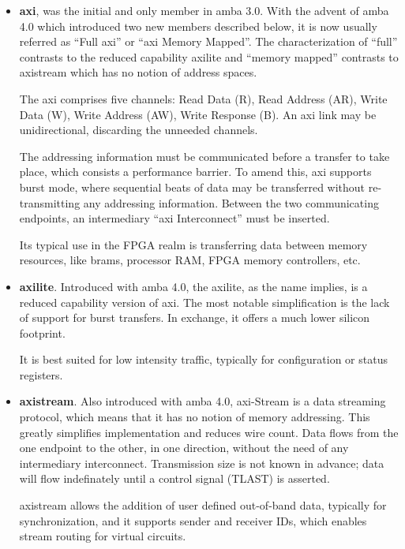 \begin{itemize}
\item	\textbf{\gls{axi}}, was the initial and only member in \gls{amba} 3.0. 
	With the advent of \gls{amba} 4.0 which introduced
	two new members described below, it is now usually 
	referred as ``Full \gls{axi}'' or ``\gls{axi} Memory Mapped''.
	The characterization of ``full'' contrasts to 
	the reduced capability \gls{axilite} and ``memory mapped''
	contrasts to \gls{axistream} which has no notion of address spaces.

	The \gls{axi} comprises five channels: Read Data (R), Read Address (AR),
	Write Data (W), Write Address (AW), Write Response (B). An \gls{axi} link
	may be unidirectional, discarding the unneeded channels.

	The addressing information must be communicated before a transfer to take place, 
	which consists a performance barrier. 
	To amend this, \gls{axi} supports \gls{burst} mode, 
	where sequential \glspl{beat} of data may be transferred without 
	re-transmitting any addressing information.
	Between the two communicating endpoints, 
	an intermediary ``\gls{axi} Interconnect'' must be inserted.

	Its typical use in the FPGA realm is transferring data between memory resources,
 	like \glspl{bram}, processor RAM, FPGA memory controllers, etc.

\item	\textbf{\gls{axilite}}. Introduced with \gls{amba} 4.0, 
	the \gls{axilite}, as the  name implies,
	is a reduced capability version of \gls{axi}. 
	The most notable simplification is the 
	lack of support for \gls{burst} transfers. 
	In exchange, it offers a much lower silicon footprint. 
	
	It is best suited for low intensity traffic, 
	typically for configuration or status registers.

\item	\textbf{\gls{axistream}}. Also introduced with \gls{amba} 4.0, 
	\gls{axi}-Stream is a data streaming protocol,
	which means that it has no notion of memory addressing.
	This greatly simplifies implementation and reduces wire count.
	Data flows from the one endpoint to the other, in one direction, 
	without the need of any intermediary interconnect.
	Transmission size is not known in advance; data will flow
	indefinately until a control signal (TLAST) is asserted.

	\gls{axistream} allows the addition of user defined out-of-band data,
	typically for synchronization, and it supports sender and receiver IDs, 
	which enables stream routing for virtual circuits.
\end{itemize}

